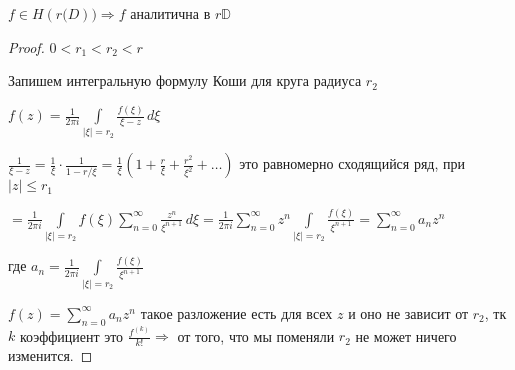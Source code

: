 
\begin{theorem}\thmslashn
	
	$f\in H(r \mathbb(D)) \Rightarrow f$ аналитична в $r \mathbb{D}$ 
	
\end{theorem}

\begin{proof}\thmslashn
	
	$0 < r_1 < r_2 < r$
	
	Запишем интегральную формулу Коши для круга радиуса $r_2$ 
	
	$f(z) = \frac{1}{2\pi i} \int\limits_{|\xi| = r_2} \frac{f(\xi)}{\xi-z}\,d\xi$
	
	$\frac{1}{\xi - z} = \frac{1}{\xi} \cdot \frac{1}{1 - r/\xi} = \frac{1}{\xi} \left( 1 + \frac{r}{\xi} + \frac{r^2}{\xi^2} + \ldots \right)$ это равномерно сходящийся ряд, при $|z| \leqslant r_1$
	
	$= \frac{1}{2\pi i} \int\limits_{|\xi| = r_2} f(\xi) \sum\limits_{n = 0}^{\infty} \frac{z^n}{\xi^{n+1}}\,d\xi = \frac{1}{2\pi i}\sum\limits_{n = 0}^{\infty} z^n \int\limits_{|\xi| = r_2} \frac{f(\xi)}{\xi^{n+1}} = \sum\limits_{n = 0}^{\infty} a_n z^n$
	
	где $a_n =  \frac{1}{2\pi i}\int\limits_{|\xi| = r_2} \frac{f(\xi)}{\xi^{n+1}}$
	
	$f(z) = \sum\limits_{n = 0}^{\infty} a_n z^n$ такое разложение есть для всех  $z$ и оно не зависит от $r_2$, тк $k$ коэффициент это $\frac{f^{(k)}}{k!} \Rightarrow$ от того, что мы поменяли $r_2$ не может ничего изменится.
	
	
\end{proof}

